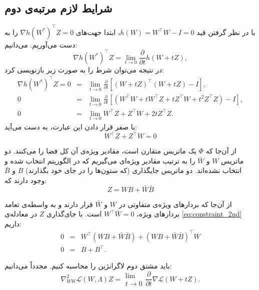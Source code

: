 \subsection{شرایط لازم مرتبه‌ی دوم}
با در نظر گرفتن قید
$h(W) = W^\top W - I = 0$،
ابتدا جهت‌های 
$\nabla h(W^*)^\top Z = 0$
را به دست می‌آوریم. می‌دانیم:
\begin{equation}
\nabla h ( W^{\ast})^\top  Z = \lim_{t \to 0}  \frac{\partial}{\partial t} h ( W + t Z),
\end{equation}
در نتیجه می‌توان شرط را به صورت زیر بازنویسی کرد:
\begin{equation}
\begin{array}{lll}
\nabla h ( W^{\ast})^\top  Z = 0 & = & 
\lim_{t \rightarrow 0}
\frac{\partial}{\partial t} [ ( W  + t Z)^\top  ( W 
+ t Z) - I],\\
0 & = &
\lim_{t \rightarrow 0}
\frac{\partial}{\partial t} [ ( W^\top   W + t W^\top  Z + t
Z^\top  W + t^2 Z^\top  Z) - I],\\
0 & = & 
\lim_{t \rightarrow 0}
 W^\top  Z + Z^\top  W + 2 t Z^\top  Z.
\end{array}
\end{equation}
 با صفر قرار دادن این عبارت، به دست می‌آید:
 \begin{equation}
   W^\top  Z + Z^\top  W = 0
 \label{eq:constraint_2nd}
 \end{equation}
 
 از آن‌جا که 
 $\Phi$
 یک ماتریس متقارن است، مقادیر ویژه‌ی آن کل فضا را 
 می‌کنند. دو ماتریس
 $W$
 و 
 $\bar{W}$
 را به ترتیب مقادیر ویژه‌ای می‌گیریم که در الگوریتم انتخاب شده و انتخاب نشده‌اند. دو ماتریس جایگذاری (که ستون‌ها را در جای خود بگذارند)
$B$
 و 
$\bar{B}$
 وجود دارند که:
\begin{equation}
Z = WB + \bar{W}\bar{B}
\end{equation}

از آن‌جا که بردار‌های ویژه‌ی متفاوتی در 
$W$
و 
$\bar{W}$
قرار دارند و به واسطه‌ی تعامد بردار‌های ویژه،
$W^\top \bar{W} = 0$
است. با جای‌گذاری 
$Z$
در معادله‌ی 
\eqref{eq:constraint_2nd}
داریم:
\begin{equation}
\begin{array}{lll}
0 & = & W^\top  ( W B + \bar{W}  \bar{B}) + ( W B + \bar{W}  \bar{B})^\top  W\\
0 & = & B + B^\top  .
\label{eq:antisym}
\end{array}
\end{equation}

باید مشتق دوم  لاگرانژین را محاسبه کنیم. مجدداً می‌دانیم:
\begin{equation}
\nabla^2_{W W} \mathcal{L} ( W, \Lambda) Z = \begin{array}{l}
\lim\\
t \rightarrow 0
\end{array} \frac{\partial}{\partial t} \nabla \mathcal{L} ( W + t Z).
\end{equation}

